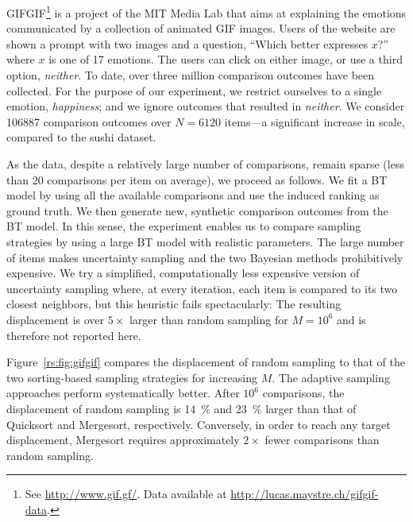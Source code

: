 GIFGIF\footnote{See \url{http://www.gif.gf/}.
Data available at \url{http://lucas.maystre.ch/gifgif-data}.} is a project of the MIT Media Lab that aims at explaining the emotions communicated by a collection of animated GIF images.
Users of the website are shown a prompt with two images and a question, ``Which better expresses $x$?'' where $x$ is one of 17 emotions.
The users can click on either image, or use a third option, \emph{neither}.
To date, over three million comparison outcomes have been collected.
For the purpose of our experiment, we restrict ourselves to a single emotion, \emph{happiness}; and we ignore outcomes that resulted in \emph{neither}.
We consider \num{106887} comparison outcomes over $N = \num{6120}$ items---a significant increase in scale, compared to the sushi dataset.

As the data, despite a relatively large number of comparisons, remain sparse (less than 20 comparisons per item on average), we proceed as follows.
We fit a BT model by using all the available comparisons and use the induced ranking as ground truth.
We then generate new, synthetic comparison outcomes from the BT model.
In this sense, the experiment enables us to compare sampling strategies by using a large BT model with realistic parameters.
The large number of items makes uncertainty sampling and the two Bayesian methods prohibitively expensive.
We try a simplified, computationally less expensive version of uncertainty sampling where, at every iteration, each item is compared to its two closest neighbors, but this heuristic fails spectacularly: The resulting displacement is over $5\times$ larger than random sampling for $M = 10^6$ and is therefore not reported here.

Figure~\ref{rs:fig:gifgif} compares the displacement of random sampling to that of the two sorting-based sampling strategies for increasing $M$.
The adaptive sampling approaches perform systematically better.
After $10^6$ comparisons, the displacement of random sampling is \num{14}~\% and \num{23}~\% larger than that of Quicksort and Mergesort, respectively.
Conversely, in order to reach any target displacement, Mergesort requires approximately $2 \times$ fewer comparisons than random sampling.
